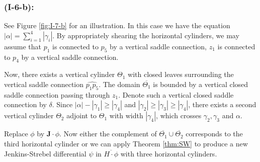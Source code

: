 \documentclass[11pt]{amsart}
\theoremstyle{plain}
\newcommand{\rot}{\mathbf{J}}
\begin{document}




\subsubsection*{\textbf{(I-6-b):}} See Figure \ref{fig:I-7-b} for an illustration. 
In this case we have the equation 
$|\alpha|=\sum\limits_{i=1}^{4}|\gamma_i|$.
By  appropriately shearing the horizontal cylinders, we may assume that $p_1$  is connected to $p_5$ by a vertical saddle connection, $z_1$
is connected to $p_4$ by a vertical saddle connection.

Now, there exists a vertical cylinder $\Theta_1$ with closed leaves surrounding the vertical saddle connection $\widehat{p_1p_5}$. The domain $\overline{\Theta_1}$ is bounded by a vertical closed saddle connection passing through $z_1$. Denote such a  vertical closed saddle connection by $\delta$. 
Since $|\alpha|-|\gamma_1|\geq |\gamma_4|$ and $|\gamma_2|\geq |\gamma_3|\geq |\gamma_4|$,
there exists a second vertical cylinder $\Theta_2$ adjoint to $\Theta_1$ with width $|\gamma_4|$, which crosses $\gamma_2, \gamma_3$ and $\alpha$. 

Replace $\phi$ by $\rot \cdot \phi$. Now either the  complement of $\overline{\Theta_1} \cup \overline{\Theta_2}$ corresponds to the third horizontal cylinder or we can apply Theorem \ref{thm:SW} to produce a new Jenkins-Strebel differential $\psi$ in $\overline{H\cdot \phi}$ with three horizontal cylinders. 
\end{document}

